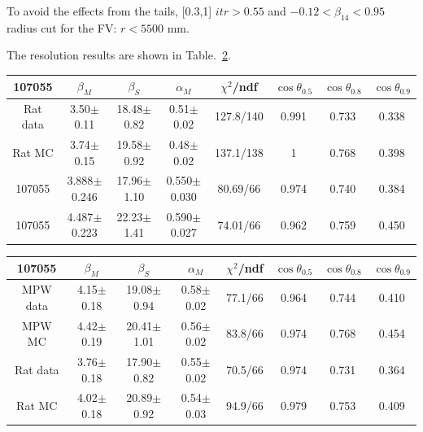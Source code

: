 To avoid the effects from the tails, [0.3,1]
$itr>0.55$ and $-0.12<\beta_{14}<0.95$
radius cut for the FV: $r<5500$ mm.


The resolution results are shown in Table.~\ref{angularResolValuesUpdated}.
\begin{table}[ht]
	\begin{tabular}{cccccccc}%
		\toprule
		107055& $\beta_M$ &  $\beta_S$ & $\alpha_M$ & $\chi^2$/ndf & $\cos\theta_{0.5}$ & $\cos\theta_{0.8}$& $\cos\theta_{0.9}$\\
		\hline
		Rat data & 3.50$\pm$0.11 & 18.48$\pm$0.82 & 0.51$\pm$0.02 & 127.8/140 & 0.991 & 0.733 & 0.338\\
		Rat MC  & 3.74$\pm$0.15 & 19.58$\pm$0.92 & 0.48$\pm$0.02 & 137.1/138 & 1 & 0.768 & 0.398\\	
		\hline
107055 & 3.888$\pm$0.246 & 17.96$\pm$1.10 & 0.550$\pm$0.030 & 80.69/66 & 0.974 & 0.740 & 0.384\\
107055 & 4.487$\pm$0.223 & 22.23$\pm$1.41 & 0.590$\pm$0.027 & 74.01/66 & 0.962 & 0.759 & 0.450\\		
		\bottomrule
	\end{tabular}
	\label{angularResolValues}
\end{table}

\begin{table}[ht]
	\begin{tabular}{cccccccc}%
		\toprule
	107055& $\beta_M$ &  $\beta_S$ & $\alpha_M$ & $\chi^2$/ndf & $\cos\theta_{0.5}$ & $\cos\theta_{0.8}$& $\cos\theta_{0.9}$\\
	\hline
	MPW data & 4.15$\pm$0.18 & 19.08$\pm$0.94 & 0.58$\pm$0.02 & 77.1/66 & 0.964 & 0.744 & 0.410 \\
	MPW MC & 4.42$\pm$0.19 & 20.41$\pm$1.01 & 0.56$\pm$0.02 & 83.8/66 & 0.974 & 0.768 & 0.454	 \\	
\hline
	Rat data & 3.76$\pm$0.18 & 17.90$\pm$0.82 & 0.55$\pm$0.02 & 70.5/66 & 0.974 & 0.731 & 0.364 \\
	Rat MC & 4.02$\pm$0.18 & 20.89$\pm$0.92 & 0.54$\pm$0.03 & 94.9/66 & 0.979 & 0.753 & 0.409	\\
		\bottomrule
	\end{tabular}
	\label{angularResolValuesUpdated}
\end{table}


